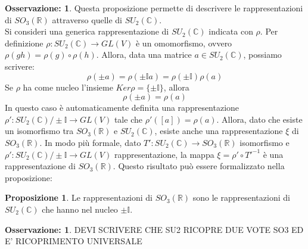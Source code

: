 \documentclass[12pt,a4paper]{report}
\theoremstyle{definition}
\newtheorem{Prop}[Def]{Proposizione}
\theoremstyle{definition}
\theoremstyle{definition}
\theoremstyle{definition}
\newtheorem{Obs}[Def]{Osservazione:}
\begin{document}
\begin{Obs}
	Questa proposizione permette di descrivere le rappresentazioni di $SO_3(\mathbb{R})$ attraverso quelle di $SU_2(\mathbb{C})$. \\
	Si consideri una generica rappresentazione di $SU_2(\mathbb{C})$ indicata con $\rho$. Per definizione $\rho:SU_2(\mathbb{C})\rightarrow GL(V)$ è un omomorfismo, ovvero $\rho(gh)=\rho(g)\circ\rho(h)$. Allora, data una matrice $a\in SU_2(\mathbb{C})$, possiamo scrivere:
	$$\rho(\pm a)=\rho(\pm \mathbb{I}a)=\rho(\pm\mathbb{I})\rho(a)$$
	Se $\rho$ ha come nucleo l'insieme $Ker\rho=\{\pm\mathbb{I}\}$, allora
	$$\rho(\pm a)=\rho(a)$$
	In questo caso è automaticamente definita una rappresentazione $\rho':SU_2(\mathbb{C})/\pm\mathbb{I}\longrightarrow GL(V)$ tale che $\rho'([a])=\rho(a)$.
	Allora, dato che esiste un isomorfismo tra $SO_3(\mathbb{R})$ e $SU_2(\mathbb{C})$, esiste anche una rappresentazione $\xi$ di $SO_3(\mathbb{R})$. In modo più formale, dato $T':SU_2(\mathbb{C})\rightarrow SO_3(\mathbb{R})$ isomorfismo e $\rho':SU_2(\mathbb{C})/\pm\mathbb{I}\longrightarrow GL(V)$ rappresentazione, la mappa $\xi=\rho'\circ T'^{-1}$ è una rappresentazione di $SO_3(\mathbb{R})$.
	Questo risultato può essere formalizzato nella proposizione:
\end{Obs}
\begin{Prop}
	Le rappresentazioni di $SO_3(\mathbb{R})$ sono le rappresentazioni di $SU_2(\mathbb{C})$ che hanno nel nucleo $\pm\mathbb{I}$. 
\end{Prop}
\begin{Obs}
	DEVI SCRIVERE CHE SU2 RICOPRE DUE VOTE SO3 ED E' RICOPRIMENTO UNIVERSALE
\end{Obs}
\end{document}
